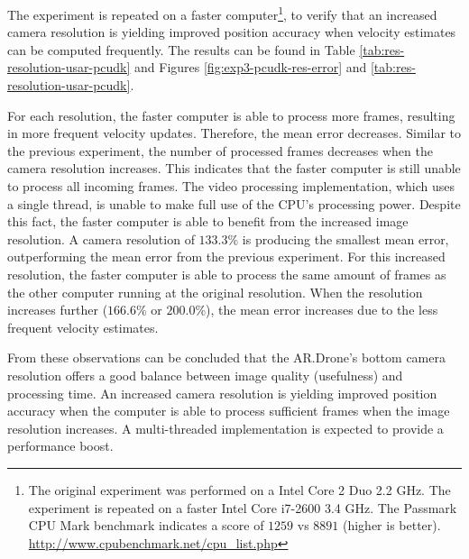 \clearpage
The experiment is repeated on a faster computer\footnote{The original experiment was performed on a Intel Core 2 Duo 2.2 GHz. The experiment is repeated on a faster Intel Core i7-2600 3.4 GHz. The Passmark CPU Mark benchmark indicates a score of $1259$ vs $8891$ (higher is better). \url{http://www.cpubenchmark.net/cpu_list.php}}, to verify that an increased camera resolution is yielding improved position accuracy when velocity estimates can be computed frequently.
The results can be found in Table \ref{tab:res-resolution-usar-pcudk} and Figures \ref{fig:exp3-pcudk-res-error} and \ref{tab:res-resolution-usar-pcudk}.

For each resolution, the faster computer is able to process more frames, resulting in more frequent velocity updates.
Therefore, the mean error decreases.
Similar to the previous experiment, the number of processed frames decreases when the camera resolution increases.
This indicates that the faster computer is still unable to process all incoming frames.
The video processing implementation, which uses a single thread, is unable to make full use of the CPU's processing power.
Despite this fact, the faster computer is able to benefit from the increased image resolution.
A camera resolution of $133.3\%$ is producing the smallest mean error, outperforming the mean error from the previous experiment.
For this increased resolution, the faster computer is able to process the same amount of frames as the other computer running at the original resolution.
When the resolution increases further ($166.6\%$ or $200.0\%$), the mean error increases due to the less frequent velocity estimates.

From these observations can be concluded that the AR.Drone's bottom camera resolution offers a good balance between image quality (usefulness) and processing time.
An increased camera resolution is yielding improved position accuracy when the computer is able to process sufficient frames when the image resolution increases.
A multi-threaded implementation is expected to provide a performance boost.


